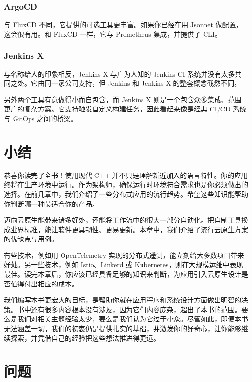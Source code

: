 \subsubsection{ArgoCD}

\label{idx:2084}
\label{idx:2085}
与 FluxCD 不同，它提供的可选工具更丰富。如果你已经在用 Jsonnet 做配置，这会很有用。和 FluxCD 一样，它与 Prometheus 集成，并提供了 CLI。

\subsubsection{Jenkins X}

\label{idx:2086}
\label{idx:2087}
与名称给人的印象相反，Jenkins X 与广为人知的 Jenkins CI 系统并没有太多共同之处。它由同一家公司支持，但 Jenkins 和 Jenkins X 的整套概念截然不同。

\label{idx:2088}
\label{idx:2089}
另外两个工具有意做得小而自包含，而 Jenkins X 则是一个包含众多集成、范围更广的复杂方案。它支持触发自定义构建任务，因此看起来像是经典 CI/CD 系统与 GitOps 之间的桥梁。

\section{小结}

恭喜你读完了全书！使用现代 C++ 并不只是理解新近加入的语言特性。你的应用终将在生产环境中运行。作为架构师，确保运行时环境符合需求也是你必须做出的选择。在前几章中，我们介绍了一些分布式应用的流行趋势。希望这些知识能帮助你判断哪一种最适合你的产品。

迈向云原生能带来诸多好处，还能将工作流中的很大一部分自动化。把自制工具换成业界标准，能让软件更具韧性、更易更新。本章中，我们介绍了流行云原生方案的优缺点与用例。

有些技术，例如用 OpenTelemetry 实现的分布式遥测，能立刻给大多数项目带来好处。另一些技术，例如 Istio、Linkerd 或 Kubernetes，则在大规模运维中表现最佳。读完本章后，你应该已经具备足够的知识来判断，为应用引入云原生设计是否值得付出相应的成本。

我们编写本书更宏大的目标，是帮助你就在应用程序和系统设计方面做出明智的决策。书中还有很多内容根本没有涉及，因为它们内容庞杂，超出了本书的范围。要么是我们对相关主题经验太少，要么是我们认为它过于小众。尽管如此，即便本书无法涵盖一切，我们的初衷仍是提供扎实的基础，并激发你的好奇心，让你能够继续探索，并凭借自己的经验把这些想法推进得更远。

\section{问题}

